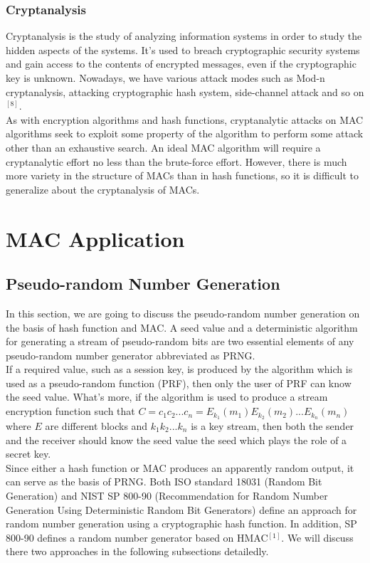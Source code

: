 \documentclass[12pt,a4paper,oneside]{report}
\begin{document}
\subsection{Cryptanalysis}
Cryptanalysis is the study of analyzing information systems in order to study the hidden aspects of the systems. It's used to breach cryptographic security systems and gain access to the contents of encrypted messages, even if the cryptographic key is unknown. Nowadays, we have various attack modes such as Mod-n cryptanalysis, attacking cryptographic hash system, side-channel attack and so on$^{[8]}$.\\

As with encryption algorithms and hash functions, cryptanalytic attacks on MAC algorithms seek to exploit some property of the algorithm to perform some attack other than an exhaustive search. An ideal MAC algorithm will require a cryptanalytic effort no less than the brute-force effort. However, there is much more variety in the structure of MACs than in hash functions, so it is difficult to generalize about the cryptanalysis of MACs.\\

\chapter{  MAC Application}
\section{Pseudo-random Number Generation}
In this section, we are going to discuss the pseudo-random number generation on the basis of hash function and MAC. A seed value and a deterministic algorithm for generating a stream of pseudo-random bits are two essential elements of any pseudo-random number generator abbreviated as PRNG.\\

If a required value, such as a session key, is produced by the algorithm which is used as a pseudo-random function (PRF), then only the user of PRF can know the seed value. What's more,  if the algorithm is used to produce a stream encryption function such that $C = c_1c_2...c_n = E_{k_1}(m_1)E_{k_2}(m_2)...E_{k_n}(m_n)$ where $E$ are different blocks and $k_1k_2...k_n$ is a key stream, then both the sender and the receiver should know the seed value the seed which plays the role of a secret key.\\

Since either a hash function or MAC produces an apparently random output, it can serve as the basis of PRNG. Both ISO standard 18031 (Random Bit Generation) and NIST SP 800-90 (Recommendation for Random Number Generation Using Deterministic Random Bit Generators) define an approach for random number generation using a cryptographic hash function. In addition, SP 800-90 defines a random number generator based on HMAC$^{[1]}$. We will discuss there two approaches in the following subsections detailedly.\\
\end{document}
